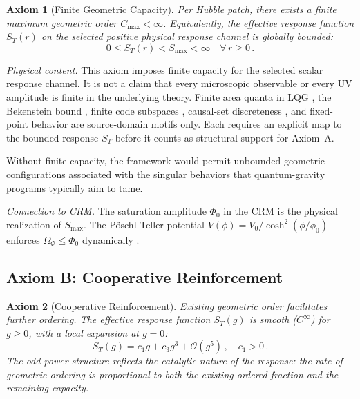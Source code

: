 \documentclass[aps,prd,twocolumn,superscriptaddress,nofootinbib]{revtex4-2}
\newtheorem{axiom}{Axiom}
\begin{document}
\begin{axiom}[Finite Geometric Capacity]
\label{ax:capacity}
Per Hubble patch, there exists a finite maximum geometric order $C_{\max} < \infty$. Equivalently, the effective response function $S_T(r)$ on the selected positive physical response channel is globally bounded:
\begin{equation}
0 \leq S_T(r) < S_{\max} < \infty \quad \forall\, r \geq 0\,.
\end{equation}
\end{axiom}

\textit{Physical content.} This axiom imposes finite capacity for the selected scalar response channel. It is not a claim that every microscopic observable or every UV amplitude is finite in the underlying theory. Finite area quanta in LQG \cite{Rovelli2004}, the Bekenstein bound \cite{Bekenstein1981}, finite code subspaces \cite{Almheiri2015}, causal-set discreteness \cite{Sorkin2003}, and fixed-point behavior \cite{Reuter1998} are source-domain motifs only. Each requires an explicit map to the bounded response $S_T$ before it counts as structural support for Axiom~A.

Without finite capacity, the framework would permit unbounded geometric configurations associated with the singular behaviors that quantum-gravity programs typically aim to tame.

\textit{Connection to CRM.} The saturation amplitude $\Phi_0$ in the CRM \cite{Geiger2026} is the physical realization of $S_{\max}$. The P\"oschl-Teller potential $V(\phi) = V_0/\cosh^2(\phi/\phi_0)$ enforces $\Omega_\Phi \leq \Phi_0$ dynamically \cite{Geiger2026c}.

\subsection{Axiom B: Cooperative Reinforcement}

\begin{axiom}[Cooperative Reinforcement]
\label{ax:cooperative}
Existing geometric order facilitates further ordering. The effective response function $S_T(g)$ is smooth ($C^\infty$) for $g \geq 0$, with a local expansion at $g = 0$:
\begin{equation}
S_T(g) = c_1 g + c_3 g^3 + \mathcal{O}(g^5)\,, \quad c_1 > 0\,.
\label{eq:ir_expansion}
\end{equation}
The odd-power structure reflects the catalytic nature of the response: the rate of geometric ordering is proportional to both the existing ordered fraction and the remaining capacity.
\end{axiom}
\end{document}
